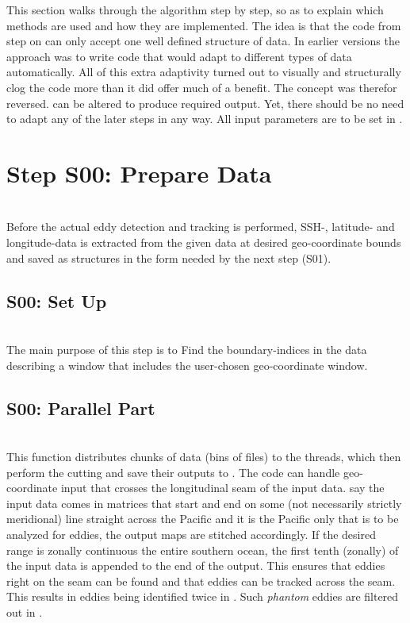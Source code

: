 This section walks through the algorithm step by step, so as to explain
which
methods are used and how they are implemented.
The idea is that the code from step  on can only accept one well
defined structure of data. In earlier versions the approach was to write code
that would adapt to different types of data automatically. All of this extra
adaptivity turned out to visually and structurally clog the code more than it
did offer much of a benefit. The concept was therefor reversed.
 can be altered to produce required output. Yet, there
should be no need to adapt any of the later steps in any way.
All input parameters are to be set in .
\section{Step S00: Prepare Data}
	\\
Before the actual eddy detection and tracking is performed,  SSH-, latitude- and longitude-data is extracted from the given data at desired geo-coordinate bounds and saved as structures in the form needed by the next step (S01).
\subsection{S00: Set Up}
\\
The main purpose of this step is to Find the boundary-indices in the data
describing a window that includes the user-chosen geo-coordinate window. 
\subsection{S00: Parallel Part}
\\
This function distributes chunks of data (\ie bins of files) to the threads, which then perform the cutting and save their outputs to .
 The code can handle geo-coordinate input that crosses the longitudinal seam of
the input data. \Eg say the input data comes in matrices that start and end on
some (not necessarily strictly meridional) line straight across the Pacific and
it is the Pacific only that is to be analyzed for eddies, the output maps are
stitched accordingly. If the desired range is zonally continuous \eg the entire
southern ocean, the first tenth (zonally) of the input data is appended to the
end of the output. This ensures that eddies right on the seam can be found and
that eddies can be tracked across the seam. This results in eddies being
identified twice in  . Such
\textit{phantom} eddies are filtered out in .

